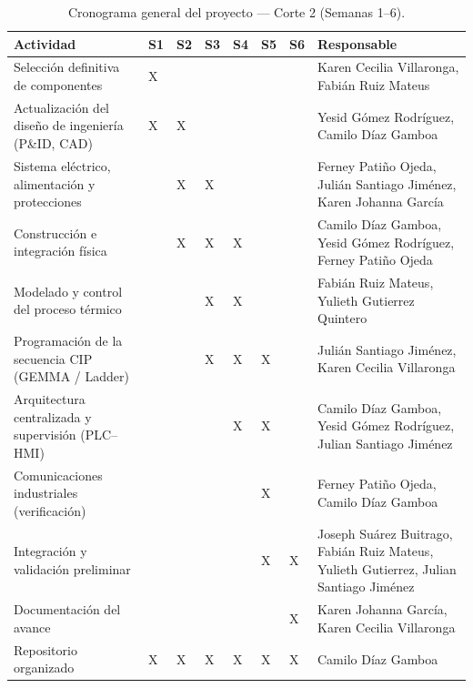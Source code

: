 \begin{table}[H]\centering\scriptsize
\caption{Cronograma general del proyecto — Corte 2 (Semanas 1--6).}
\label{tab:cronograma-corte2}
\begin{tabularx}{\textwidth}{L{4.0cm}*{6}{C{0.75cm}}L{4.3cm}}\toprule
\textbf{Actividad} & \textbf{S1} & \textbf{S2} & \textbf{S3} & \textbf{S4} & \textbf{S5} & \textbf{S6} & \textbf{Responsable}\\\midrule
Selección definitiva de componentes & X & & & & & & Karen Cecilia Villaronga, Fabián Ruiz Mateus\\
Actualización del diseño de ingeniería (P\&ID, CAD) & X & X & & & & & Yesid Gómez Rodríguez, Camilo Díaz Gamboa\\
Sistema eléctrico, alimentación y protecciones & & X & X & & & & Ferney Patiño Ojeda, Julián Santiago Jiménez, Karen Johanna García\\
Construcción e integración física & & X & X & X & & & Camilo Díaz Gamboa, Yesid Gómez Rodríguez, Ferney Patiño Ojeda\\
Modelado y control del proceso térmico & & & X & X & & & Fabián Ruiz Mateus, Yulieth Gutierrez Quintero\\
Programación de la secuencia CIP (GEMMA / Ladder) & & & X & X & X & & Julián Santiago Jiménez, Karen Cecilia Villaronga\\
Arquitectura centralizada y supervisión (PLC--HMI) & & & & X & X & & Camilo Díaz Gamboa, Yesid Gómez Rodríguez, Julian Santiago Jiménez\\
Comunicaciones industriales (verificación) & & & & & X & & Ferney Patiño Ojeda,  Camilo Díaz Gamboa\\
Integración y validación preliminar & & & & & X & X & Joseph Suárez Buitrago, Fabián Ruiz Mateus, Yulieth Gutierrez, Julian Santiago Jiménez\\
Documentación del avance & & & & & & X & Karen Johanna García, Karen Cecilia Villaronga\\\bottomrule
Repositorio organizado & X & X & X & X & X & X & Camilo Díaz Gamboa\\\bottomrule
\end{tabularx}\end{table}
